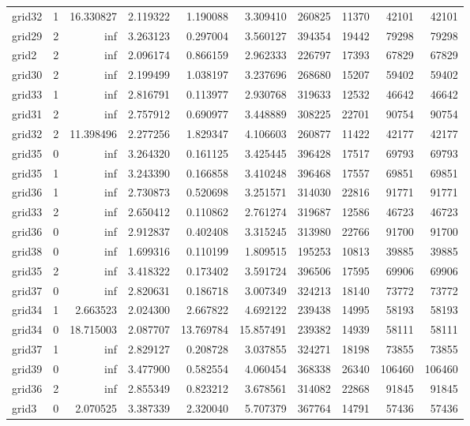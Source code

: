 \begin{longtable}{|l|r|r|r|r|r|r|r|r|r|}
grid32 & 1 & 16.330827 & 2.119322 & 1.190088 & 3.309410 & 260825 & 11370 & 42101 & 42101 \\
grid29 & 2 & inf & 3.263123 & 0.297004 & 3.560127 & 394354 & 19442 & 79298 & 79298 \\
grid2 & 2 & inf & 2.096174 & 0.866159 & 2.962333 & 226797 & 17393 & 67829 & 67829 \\
grid30 & 2 & inf & 2.199499 & 1.038197 & 3.237696 & 268680 & 15207 & 59402 & 59402 \\
grid33 & 1 & inf & 2.816791 & 0.113977 & 2.930768 & 319633 & 12532 & 46642 & 46642 \\
grid31 & 2 & inf & 2.757912 & 0.690977 & 3.448889 & 308225 & 22701 & 90754 & 90754 \\
grid32 & 2 & 11.398496 & 2.277256 & 1.829347 & 4.106603 & 260877 & 11422 & 42177 & 42177 \\
grid35 & 0 & inf & 3.264320 & 0.161125 & 3.425445 & 396428 & 17517 & 69793 & 69793 \\
grid35 & 1 & inf & 3.243390 & 0.166858 & 3.410248 & 396468 & 17557 & 69851 & 69851 \\
grid36 & 1 & inf & 2.730873 & 0.520698 & 3.251571 & 314030 & 22816 & 91771 & 91771 \\
grid33 & 2 & inf & 2.650412 & 0.110862 & 2.761274 & 319687 & 12586 & 46723 & 46723 \\
grid36 & 0 & inf & 2.912837 & 0.402408 & 3.315245 & 313980 & 22766 & 91700 & 91700 \\
grid38 & 0 & inf & 1.699316 & 0.110199 & 1.809515 & 195253 & 10813 & 39885 & 39885 \\
grid35 & 2 & inf & 3.418322 & 0.173402 & 3.591724 & 396506 & 17595 & 69906 & 69906 \\
grid37 & 0 & inf & 2.820631 & 0.186718 & 3.007349 & 324213 & 18140 & 73772 & 73772 \\
grid34 & 1 & 2.663523 & 2.024300 & 2.667822 & 4.692122 & 239438 & 14995 & 58193 & 58193 \\
grid34 & 0 & 18.715003 & 2.087707 & 13.769784 & 15.857491 & 239382 & 14939 & 58111 & 58111 \\
grid37 & 1 & inf & 2.829127 & 0.208728 & 3.037855 & 324271 & 18198 & 73855 & 73855 \\
grid39 & 0 & inf & 3.477900 & 0.582554 & 4.060454 & 368338 & 26340 & 106460 & 106460 \\
grid36 & 2 & inf & 2.855349 & 0.823212 & 3.678561 & 314082 & 22868 & 91845 & 91845 \\
grid3 & 0 & 2.070525 & 3.387339 & 2.320040 & 5.707379 & 367764 & 14791 & 57436 & 57436 \\

\end{longtable}
